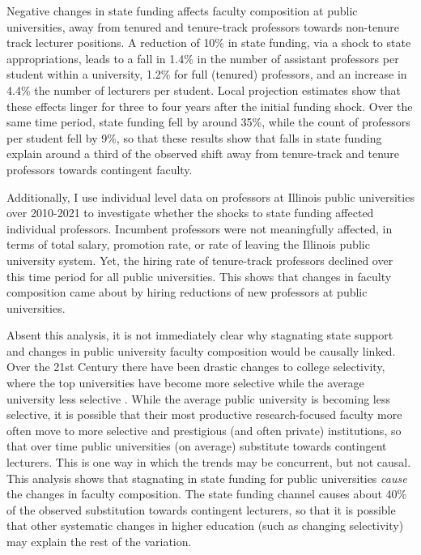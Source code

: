 Negative changes in state funding affects faculty composition at public universities, away from tenured and tenure-track professors towards non-tenure track lecturer positions.
A reduction of 10\% in state funding, via a shock to state appropriations, leads to a fall in 1.4\% in the number of assistant professors per student within a university, 1.2\% for full (tenured) professors, and an increase in 4.4\% the number of lecturers per student.
Local projection estimates show that these effects linger for three to four years after the initial funding shock.
Over the same time period, state funding fell by around 35\%, while the count of professors per student fell by 9\%, so that these results show that falls in state funding explain around a third of the observed shift away from tenure-track and tenure professors towards contingent faculty.

Additionally, I use individual level data on professors at Illinois public universities over 2010-2021 to investigate whether the shocks to state funding affected individual professors.
Incumbent professors were not meaningfully affected, in terms of total salary, promotion rate, or rate of leaving the Illinois public university system.
Yet, the hiring rate of tenure-track professors declined over this time period for all public universities.
This shows that changes in faculty composition came about by hiring reductions of new professors at public universities.

Absent this analysis, it is not immediately clear why stagnating state support and changes in public university faculty composition would be causally linked.
Over the 21st Century there have been drastic changes to college selectivity, where the top universities have become more selective while the average university less selective \citep{hoxby2009changing}.
While the average public university is becoming less selective, it is possible that their most productive research-focused faculty more often move to more selective and prestigious (and often private) institutions, so that over time public universities (on average) substitute towards contingent lecturers. 
This is one way in which the trends may be concurrent, but not causal.
This analysis shows that stagnating in state funding for public universities \textit{cause} the changes in faculty composition.
The state funding channel causes about 40\% of the observed substitution towards contingent lecturers, so that it is possible that other systematic changes in higher education (such as changing selectivity) may explain the rest of the variation.

